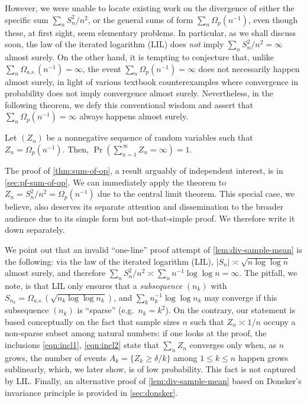 However, we were unable to locate existing work on the divergence of either the specific sum $\sum_n S_n^2/n^2$, or the general sums of form $\sum_n \Omega_p(n^{-1})$, even though these, at first sight, seem elementary problems. In particular, as we shall discuss soon, the law of the iterated logarithm (LIL) does \emph{not} imply $\sum_n S_n^2/n^2 = \infty$ almost surely. On the other hand, it is tempting to conjecture that, unlike $\sum_n \Omega_{a.s.}(n^{-1})=\infty$, the event $\sum_n \Omega_p(n^{-1}) = \infty$ does not necessarily happen almost surely, in light of various textbook counterexamples where convergence in probability does not imply convergence almost surely. Nevertheless, in the following theorem, we defy this conventional wisdom and assert that $\sum_n \Omega_p(n^{-1}) = \infty$ always happens almost surely.


\begin{theorem}\label{thm:sum-of-op}
    Let $(Z_n)$ be a nonnegative sequence of random variables such that $Z_n = \Omega_p(n^{-1})$. Then, $\Pr(\sum_{n=1}^\infty Z_n = \infty) = 1$.
\end{theorem}

The proof of \cref{thm:sum-of-op}, a result arguably of independent interest, is in \cref{sec:pf-sum-of-op}.
We can immediately apply the theorem to $Z_n = S_n^2/n^2 = \Omega_p(n^{-1})$ due to the central limit theorem. This special case, we believe, also deserves its separate attention and dissemination to the broader audience due to its simple form but not-that-simple proof. We therefore write it down separately.


We point out that an invalid ``one-line'' proof attempt of \cref{lem:div-sample-mean} is the following: via the law of the iterated logarithm (LIL), $|S_n| \asymp \sqrt{n \log \log n}$ almost surely, and therefore $\sum_n S_n^2/n^2 \asymp \sum_n n^{-1} \log \log n = \infty$. The pitfall, we note, is that LIL only ensures that a \emph{subsequence} $(n_k)$ with $S_{n_k} = \Omega_{a.s.} (\sqrt{n_k \log\log n_k})$, and $\sum_{k} n_k^{-1} \log\log n_k$ may converge if  this subsequence $(n_k)$ is ``sparse'' (e.g.\ $n_k = k^2$). On the contrary, our statement is based conceptually on the fact that sample sizes $n$ such that $Z_n \asymp 1/n$ occupy a non-sparse subset among natural numbers: if one looks at the proof, the inclusions \eqref{eqn:incl1}, \eqref{eqn:incl2} state that $\sum_n Z_n$ converges only when, as $n$ grows, the number of events $A_k = \{ Z_k \ge \delta/k \}$ among $1\le k\le n$ happen grows sublinearly, which, we later show, is of low probability. This fact is not captured by LIL. Finally, an alternative proof of \cref{lem:div-sample-mean} based on Donsker's invariance principle is provided in \cref{sec:donsker}.


